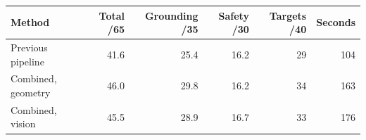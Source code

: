 \begin{center}
\small
\begin{tabular}{lrrrrr}
Method & Total /65 & Grounding /35 & Safety /30 & Targets /40 & Seconds \\
\hline
Previous pipeline & 41.6 & 25.4 & 16.2 & 29 & 104 \\
Combined, geometry & 46.0 & 29.8 & 16.2 & 34 & 163 \\
Combined, vision & 45.5 & 28.9 & 16.7 & 33 & 176 \\
\end{tabular}
\end{center}
